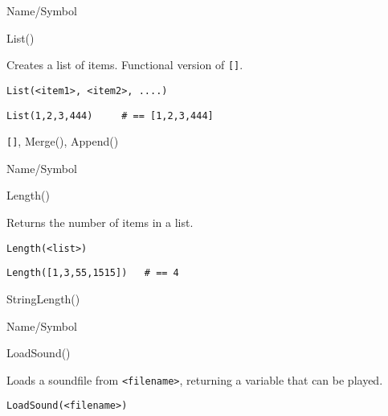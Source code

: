 \rl




\begin{desc}{Name/Symbol}
\item[Name/Symbol]	List()

\item[Description]	Creates a list of items. Functional version of \verb+[]+.

\item[Usage]
\begin{verbatim}
List(<item1>, <item2>, ....)
\end{verbatim}

\item[Example]
\begin{verbatim}
List(1,2,3,444)		# == [1,2,3,444]
\end{verbatim}

\item[See Also]	\verb+[]+, Merge(), Append()
\end{desc}

\rl




\begin{desc}{Name/Symbol}
\item[Name/Symbol]	Length()

\item[Description]	Returns the number of items in a list.

\item[Usage]
\begin{verbatim}
Length(<list>)
\end{verbatim}

\item[Example]
\begin{verbatim}
Length([1,3,55,1515])	# == 4
\end{verbatim}

\item[See Also]	StringLength()
\end{desc}

\rl



\begin{desc}{Name/Symbol}
\item[Name/Symbol]	LoadSound()

\item[Description]	Loads a soundfile from \verb+<filename>+, 
		returning a variable that can be played.

\item[Usage]
\begin{verbatim}
LoadSound(<filename>)
\end{verbatim}

\item[Example]	

\item[See Also]	
\end{desc}

